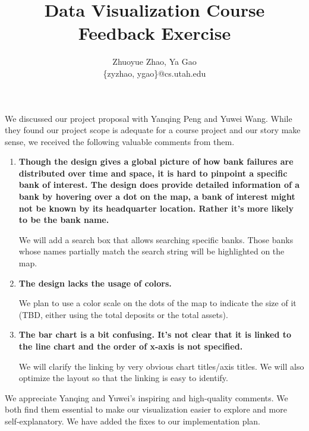\documentclass[11pt]{article}
\title{Data Visualization Course Feedback Exercise}
\author{Zhuoyue Zhao, Ya Gao\\\{zyzhao, ygao\}@cs.utah.edu}
\date{}
\begin{document}
\maketitle

We discussed our project proposal with Yanqing Peng and Yuwei Wang. While they
found our project scope is adequate for a course project and our story make
sense, we received the following valuable comments from them.

\begin{enumerate}[1.]
    \item {\bfseries
        Though the design gives a global picture of how bank failures are
        distributed over time and space, it is hard to pinpoint a specific
        bank of interest. The design does provide detailed information of a
        bank by hovering over a dot on the map, a bank of interest might not
        be known by its headquarter location. Rather it's more likely to be
        the bank name.}

    We will add a search box that allows searching specific banks. Those banks
    whose names partially match the search string will be highlighted on the
    map.

    \item {\bfseries
        The design lacks the usage of colors.
    }

    We plan to use a color scale on the dots of the map to indicate the size
    of it (TBD, either using the total deposits or the total assets).

    \item {\bfseries
        The bar chart is a bit confusing. It's not clear that it is linked to
        the line chart and the order of x-axis is not specified.
    }

    We will clarify the linking by very obvious chart titles/axis titles. We
    will also optimize the layout so that the linking is easy to identify.
\end{enumerate}

We appreciate Yanqing and Yuwei's inspiring and high-quality comments. We
both find them essential to make our visualization easier to explore and more
self-explanatory. We have added the fixes to our implementation plan.
\end{document}
